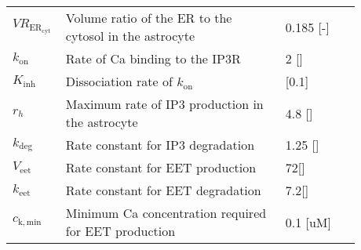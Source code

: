 \begin{table}[h!]
	\centering
	\begin{tabular}{| p{0.09\linewidth} | >{\footnotesize} p{0.6\linewidth} | >{\footnotesize} p{0.17\linewidth} | >{\footnotesize} p{0.02\linewidth} |}
		\arrayrulecolor{lightgrey}\hline
		$ VR_{\mathrm{ER_{\mathrm{cyt}}}} $  & Volume ratio of the \gls{ER} to the cytosol in the astrocyte  & 0.185 [-] & \cite{Farr2011} \\
		$k_{\mathrm{on}} $         & Rate of \gls{Ca} binding to the \gls{IP3}R & 2 [\uMps] & \cite{Farr2011} \\
		$K_{\mathrm{inh}}$          & Dissociation rate of $k_{\mathrm{on}}$  & [0.1\uM] & \cite{Farr2011} \\
		$r_h$                      & Maximum rate of \gls{IP3} production in the astrocyte & 4.8 [\uM] & \cite{Farr2011} \\
		$k_{\mathrm{deg}}$          & Rate constant for \gls{IP3} degradation & 1.25 [\pers] & \cite{Farr2011} \\
		$V_{\mathrm{eet}} $        & Rate constant for EET production   & 72[\uM] & \cite{Farr2011} \\
		$k_{\mathrm{eet}}$         & Rate constant for EET degradation  & 7.2[\uM] & \cite{Farr2011} \\
		$c_{\mathrm{k,min}}$       & Minimum \gls{Ca} concentration required for EET production & 0.1 [uM] & \cite{Farr2011} \\			
		\hline
	\end{tabular}
\end{table}
		
